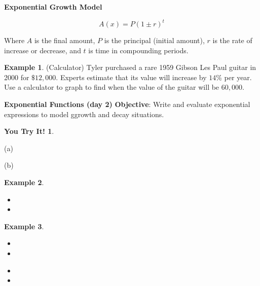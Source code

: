 \documentclass{report}
\theoremstyle{definition}
\newtheorem{example}{\bf Example}
\newtheorem{youtry}{\bf You Try It!}
\begin{document}
\noindent \large \textbf{Exponential Growth Model}

\Large
\[A(x)=P(1 \pm r)^t\]
\normalsize

\noindent Where $A$ is the final amount, $P$ is the principal (initial amount), $r$ is the rate of increase or decrease, and $t$ is time in compounding periods.

\begin{example}
(Calculator) Tyler purchased a rare 1959 Gibson Les Paul guitar in 2000 for $\$12,000$. Experts estimate that its value will increase by $14\%$ per year. Use a calculator to graph to find when the value of the guitar will be $60,000$.
\end{example}

\vfill

 \noindent{} \hfill 
 \newpage

\noindent\Large{\textbf{Exponential Functions (day 2)}}  \indent\hfill\small\noindent \textbf{Objective}: Write and evaluate exponential expressions to model ggrowth and decay situations.\normalsize\\

\begin{youtry}
\end{youtry}

\begin{minipage}[t]{0.45\linewidth}
(a) 
\end{minipage}
\hfill
\begin{minipage}[t]{0.45\linewidth}
(b) 
\end{minipage}
\vfill

\begin{example}
\end{example}
\begin{itemize}
	\item[(a)] 
	\vfill
	\item[(b)] 
	\vfill
\end{itemize}

\begin{example}
\end{example}


\begin{minipage}[t]{0.45\linewidth}
	\begin{itemize}
		\item[(a)] 
		\vspace{1cm}
		\item[(c)] 
	\end{itemize}
\end{minipage}
\begin{minipage}[t]{0.45\linewidth}
	\begin{itemize}
		\item[(b)] 
		\vspace{1cm}
		\item[(d)] 
	\end{itemize}
\end{minipage}
\vfill
\end{document}
